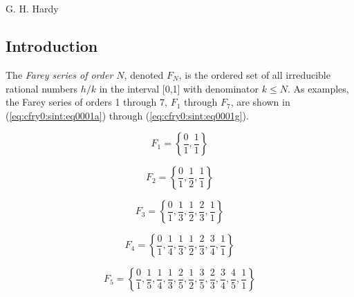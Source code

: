 
\chapter{\cfryzerolongtitle{}}

\label{cfry0}

                   {G. H. Hardy \cite[p.85]{bibref:b:mathematiciansapology:1940}}

\section{Introduction}
\label{cfry0:sint}

The \emph{Farey series
of order $N$}, denoted $F_{N}$,
is the ordered set of all irreducible
rational numbers $h/k$ in the interval
[0,1]
with denominator $k\leq N$.
As examples, the Farey series of
orders 1 through 7, $F_1$ through $F_7$, are shown
in (\ref{eq:cfry0:sint:eq0001a}) through (\ref{eq:cfry0:sint:eq0001g}).

\begin{equation}
\label{eq:cfry0:sint:eq0001a}
F_1  = \left\{ {\frac{0}{1},\frac{1}{1}} \right\}
\end{equation}

\begin{equation}
\label{eq:cfry0:sint:eq0001b}
F_2  = \left\{ {\frac{0}{1},\frac{1}{2},\frac{1}{1}} \right\}
\end{equation}

\begin{equation}
\label{eq:cfry0:sint:eq0001c}
F_3  = \left\{ {\frac{0}{1},\frac{1}{3},\frac{1}{2},
                \frac{2}{3},\frac{1}{1}} \right\}
\end{equation}

\begin{equation}
\label{eq:cfry0:sint:eq0001d}
F_4  = \left\{ {\frac{0}{1},\frac{1}{4},
                \frac{1}{3},\frac{1}{2},
                \frac{2}{3},\frac{3}{4},
                \frac{1}{1}} \right\}
\end{equation}

\begin{equation}
\label{eq:cfry0:sint:eq0001e}
F_5  = \left\{ {\frac{0}{1},\frac{1}{5},\frac{1}{4},
                \frac{1}{3},\frac{2}{5},\frac{1}{2},
                \frac{3}{5},\frac{2}{3},\frac{3}{4},
                \frac{4}{5},\frac{1}{1}} \right\}
\end{equation}

